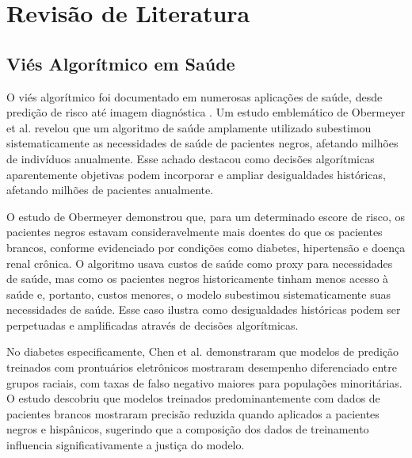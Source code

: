 
\section{Revisão de Literatura}

\subsection{Viés Algorítmico em Saúde}

O viés algorítmico foi documentado em numerosas aplicações de saúde, desde 
predição de risco até imagem diagnóstica \cite{rajkomar2018}. Um estudo 
emblemático de Obermeyer et al. \cite{obermeyer2019} revelou que um 
algoritmo de saúde amplamente utilizado subestimou sistematicamente as 
necessidades de saúde de pacientes negros, afetando milhões de indivíduos 
anualmente. Esse achado destacou como decisões algorítmicas aparentemente 
objetivas podem incorporar e ampliar desigualdades históricas, afetando 
milhões de pacientes anualmente.

O estudo de Obermeyer demonstrou que, para um determinado escore de risco, 
os pacientes negros estavam consideravelmente mais doentes do que os 
pacientes brancos, conforme evidenciado por condições como diabetes, 
hipertensão e doença renal crônica. O algoritmo usava custos de saúde como 
proxy para necessidades de saúde, mas como os pacientes negros historicamente 
tinham menos acesso à saúde e, portanto, custos menores, o modelo subestimou 
sistematicamente suas necessidades de saúde. Esse caso ilustra como 
desigualdades históricas podem ser perpetuadas e amplificadas através de 
decisões algorítmicas.

No diabetes especificamente, Chen et al. \cite{chen2019} demonstraram que 
modelos de predição treinados com prontuários eletrônicos mostraram desempenho 
diferenciado entre grupos raciais, com taxas de falso negativo maiores para 
populações minoritárias. O estudo descobriu que modelos treinados 
predominantemente com dados de pacientes brancos mostraram precisão reduzida 
quando aplicados a pacientes negros e hispânicos, sugerindo que a composição 
dos dados de treinamento influencia significativamente a justiça do modelo.

